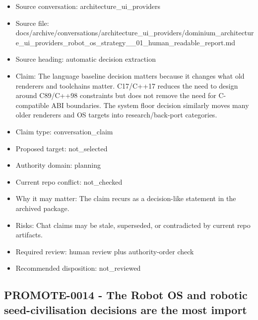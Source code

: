 \documentclass[11pt,a4paper]{report}
\begin{document}
\begin{itemize}
\item Source conversation: architecture\_ui\_providers
\item Source file: docs/archive/conversations/architecture\_ui\_providers/dominium\_architecture\_ui\_providers\_robot\_os\_strategy\_\_01\_human\_readable\_report.md
\item Source heading: automatic decision extraction
\item Claim: The language baseline decision matters because it changes what old renderers and toolchains matter. C17/C++17 reduces the need to design around C89/C++98 constraints but does not remove the need for C-compatible ABI boundaries. The system floor decision similarly moves many older renderers and OS targets into research/back-port categories.
\item Claim type: conversation\_claim
\item Proposed target: not\_selected
\item Authority domain: planning
\item Current repo conflict: not\_checked
\item Why it may matter: The claim recurs as a decision-like statement in the archived package.
\item Risks: Chat claims may be stale, superseded, or contradicted by current repo artifacts.
\item Required review: human review plus authority-order check
\item Recommended disposition: not\_reviewed
\end{itemize}

\subsection{PROMOTE-0014 - The Robot OS and robotic seed-civilisation decisions are the most import}
\end{document}
